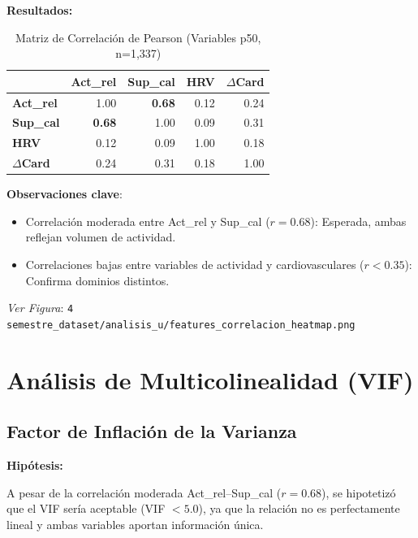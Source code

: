 \documentclass[12pt,letterpaper,twoside]{report}
\begin{document}
\begin{calculobox}
\textbf{Resultados:}

\begin{table}[H]
\centering
\caption{Matriz de Correlación de Pearson (Variables p50, n=1,337)}
\label{tab:correlation_matrix}
\begin{tabular}{@{}lrrrr@{}}
\toprule
 & \textbf{Act\_rel} & \textbf{Sup\_cal} & \textbf{HRV} & \textbf{$\Delta$Card} \\
\midrule
\textbf{Act\_rel}     & 1.00 & \textbf{0.68} & 0.12 & 0.24 \\
\textbf{Sup\_cal}     & \textbf{0.68} & 1.00 & 0.09 & 0.31 \\
\textbf{HRV}          & 0.12 & 0.09 & 1.00 & 0.18 \\
\textbf{$\Delta$Card} & 0.24 & 0.31 & 0.18 & 1.00 \\
\bottomrule
\end{tabular}
\end{table}

\textbf{Observaciones clave}:
\begin{itemize}[noitemsep]
    \item Correlación moderada entre Act\_rel y Sup\_cal ($r=0.68$): Esperada, ambas reflejan volumen de actividad.
    \item Correlaciones bajas entre variables de actividad y cardiovasculares ($r < 0.35$): Confirma dominios distintos.
\end{itemize}
\end{calculobox}

\textit{Ver Figura}: \texttt{4 semestre\_dataset/analisis\_u/features\_correlacion\_heatmap.png}

\section{Análisis de Multicolinealidad (VIF)}

\subsection{Factor de Inflación de la Varianza}

\begin{hipotesisbox}
\textbf{Hipótesis:}

A pesar de la correlación moderada Act\_rel--Sup\_cal ($r=0.68$), se hipotetizó que el VIF sería aceptable (VIF $< 5.0$), ya que la relación no es perfectamente lineal y ambas variables aportan información única.
\end{hipotesisbox}
\end{document}
